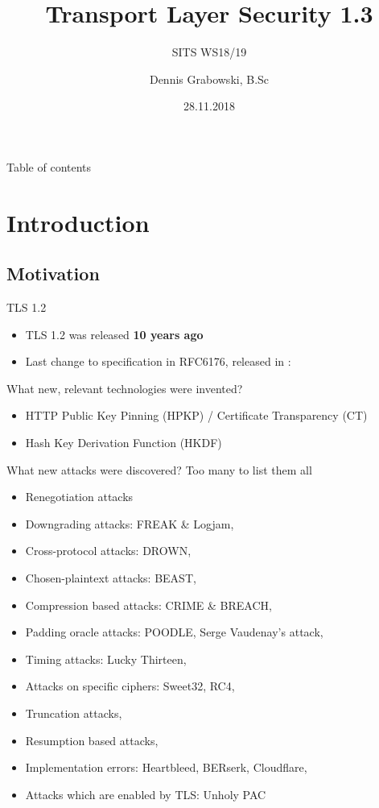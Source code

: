 \documentclass{f4_beamer_metropolis}
\title{Transport Layer Security 1.3}
\subtitle{SITS WS18/19}
\author{Dennis Grabowski, B.Sc}
\date{28.11.2018}
\begin{document}
\begin{frame}{Table of contents}
    \tableofcontents[hideallsubsections]
  \end{frame}

\section{Introduction}

\subsection{Motivation}

\begin{frame}{TLS 1.2}
\begin{itemize}
  \item TLS 1.2 was released \textbf{10 years ago}
  \item Last change to specification in RFC6176, released in \textbf{\citeyear{RFC6176}}: \newline
  \textit{}

\end{itemize}
\end{frame}

\begin{frame}{What new, relevant technologies were invented?}
  \begin{itemize}
    \item HTTP Public Key Pinning (HPKP) / Certificate Transparency (CT)
    \item Hash Key Derivation Function (HKDF)
  \end{itemize}
  \end{frame}

\begin{frame}{What new attacks were discovered?}
Too many to list them all
  \begin{itemize}
    \item Renegotiation attacks
    \item Downgrading attacks: FREAK \& Logjam,
    \item Cross-protocol attacks: DROWN,
    \item Chosen-plaintext attacks: BEAST,
    \item Compression based attacks: CRIME \& BREACH,
    \item Padding oracle attacks: POODLE, Serge Vaudenay's attack,
    \item Timing attacks: Lucky Thirteen,
    \item Attacks on specific ciphers: Sweet32, RC4,
    \item Truncation attacks,
    \item Resumption based attacks,
    \item Implementation errors: Heartbleed, BERserk, Cloudflare,
    \item Attacks which are enabled by TLS: Unholy PAC
  \end{itemize}

\end{frame}
\end{document}
